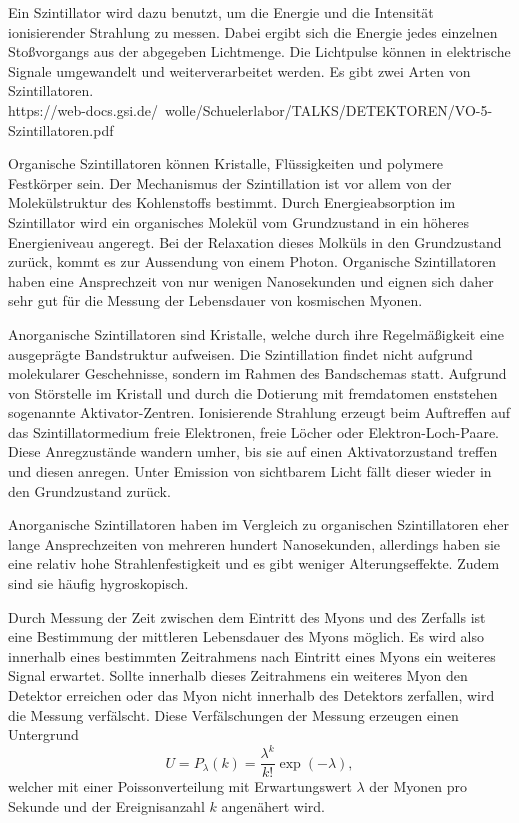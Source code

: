 Ein Szintillator wird dazu benutzt, um die Energie und die Intensität ionisierender Strahlung zu messen. Dabei ergibt sich die Energie 
jedes einzelnen Stoßvorgangs aus der abgegeben Lichtmenge.
Die Lichtpulse können in elektrische Signale umgewandelt und weiterverarbeitet werden.
Es gibt zwei Arten von Szintillatoren.\\

https://web-docs.gsi.de/~wolle/Schuelerlabor/TALKS/DETEKTOREN/VO-5-Szintillatoren.pdf

Organische Szintillatoren können Kristalle, Flüssigkeiten und polymere Festkörper sein. 
Der Mechanismus der Szintillation ist vor allem von der Molekülstruktur des Kohlenstoffs bestimmt.
Durch Energieabsorption im Szintillator wird ein organisches Molekül vom Grundzustand in ein höheres Energieniveau angeregt.
Bei der Relaxation dieses Molküls in den Grundzustand zurück, kommt es zur Aussendung von einem Photon.
Organische Szintillatoren haben eine Ansprechzeit von nur wenigen Nanosekunden und eignen sich daher sehr gut für die Messung der Lebensdauer
von kosmischen Myonen.

Anorganische Szintillatoren sind Kristalle, welche durch ihre Regelmäßigkeit eine ausgeprägte Bandstruktur aufweisen.
Die Szintillation findet nicht aufgrund molekularer Geschehnisse, sondern im Rahmen des Bandschemas statt.
Aufgrund von Störstelle im Kristall und durch die Dotierung mit fremdatomen enststehen sogenannte Aktivator-Zentren.
Ionisierende Strahlung erzeugt beim Auftreffen auf das Szintillatormedium freie 
Elektronen, freie Löcher oder Elektron-Loch-Paare. Diese Anregzustände wandern umher, bis sie auf einen Aktivatorzustand treffen und diesen
anregen. Unter Emission von sichtbarem Licht fällt dieser wieder in den Grundzustand zurück.

Anorganische Szintillatoren haben im Vergleich zu organischen Szintillatoren eher lange Ansprechzeiten von mehreren hundert Nanosekunden,
allerdings haben sie eine relativ hohe Strahlenfestigkeit und es gibt weniger Alterungseffekte. Zudem sind sie häufig hygroskopisch.

Durch Messung der Zeit zwischen dem Eintritt des Myons und des
Zerfalls ist eine Bestimmung der mittleren Lebensdauer des Myons möglich.
Es wird also innerhalb eines bestimmten Zeitrahmens nach Eintritt eines Myons ein weiteres Signal
erwartet.
Sollte innerhalb dieses Zeitrahmens ein weiteres Myon den Detektor erreichen oder das
Myon nicht innerhalb des Detektors zerfallen, wird die Messung verfälscht.
Diese Verfälschungen der Messung erzeugen einen Untergrund
\begin{equation}
  U = P_{\lambda} (k) = \frac{\lambda^{k}}{k!} \exp{(-\lambda)},
  \label{eqn:Untergrundrate}
\end{equation}
welcher mit einer Poissonverteilung mit Erwartungswert $\lambda$ der Myonen pro Sekunde und der Ereignisanzahl $k$ angenähert wird.

